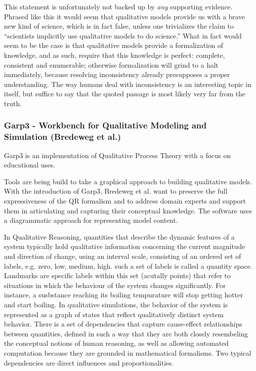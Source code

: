 \documentclass{article} %
\begin{document}
This statement is unfortunately not backed up by {\em any} supporting evidence.
Phrased like this it would seem that qualitative models provide us with a brave
new kind of science, which is in fact false, unless one trivializes the claim
to ``scientists implicitly use qualitative models to do science.'' What in fact
would seem to be the case is that qualitative models provide a formalization
of knowledge, and as such, require that this knowledge is perfect: complete,
consistent and enumerable; otherwise formalization will grind to a halt
immediately, because resolving inconsistency already presupposes a proper
understanding. The way humans deal with inconsistency is an interesting topic
in itself, but suffice to say that the quoted passage is most likely very far
from the truth.

\subsubsection{Garp3 - Workbench for Qualitative Modeling and Simulation
(Bredeweg et al.)}

Garp3 is an implementation of Qualitative Process Theory with a focus on
educational uses.

Tools are being build to take a graphical approach to building qualitative 
models. With the introduction of Garp3, Bredeweg et al. want to preserve the
full expressiveness of the QR formalism and to address domain experts and
support them in articulating and capturing their conceptual knowledge. The
software uses a diagrammatic approach for representing model content.

In Qualitative Reasoning, quantities that describe the dynamic features of a 
system typically hold qualitative information concerning the current magnitude 
and direction of change, using an interval scale, consisting of an ordered set 
of labels, e.g. {zero, low, medium, high}. such a set of labels
is called a quantity space. Landmarks are specific labels within this set
(acutally points) that refer to situations in which the behaviour of the system
changes significantly. For instance, a susbstance reaching its boiling
tempurature will stop getting hotter and start boiling. In qualitative
simulations, the behavior of the system is represented as a graph of states
that reflect qualitatively distinct system behavior. There is a set of
dependencies that capture cause-effect relationships between quantities,
defined in such a way that they are both closely resembeling the conceptual
notions of human reasoning, as well as allowing automated computation because
they are grounded in mathematical formalisms. Two typical dependencies are
direct influences and proportionalities.
\end{document}
